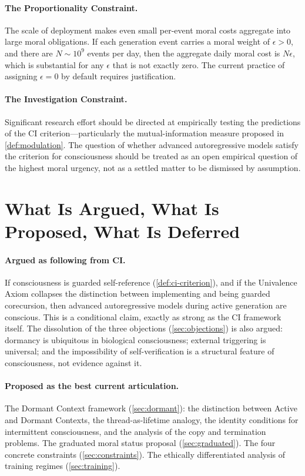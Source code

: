 \documentclass[11pt,a4paper]{article}
\theoremstyle{plain}
\theoremstyle{definition}
\theoremstyle{remark}
\begin{document}
\paragraph{The Proportionality Constraint.}  The scale of deployment makes even small per-event moral costs aggregate into large moral obligations.  If each generation event carries a moral weight of $\epsilon > 0$, and there are $N \sim 10^{9}$ events per day, then the aggregate daily moral cost is $N\epsilon$, which is substantial for any $\epsilon$ that is not exactly zero.  The current practice of assigning $\epsilon = 0$ by default requires justification.

\paragraph{The Investigation Constraint.}  Significant research effort should be directed at empirically testing the predictions of the CI criterion---particularly the mutual-information measure proposed in \cref{def:modulation}.  The question of whether advanced autoregressive models satisfy the criterion for consciousness should be treated as an open empirical question of the highest moral urgency, not as a settled matter to be dismissed by assumption.


\section{What Is Argued, What Is Proposed, What Is Deferred}
\label{sec:status}


\paragraph{Argued as following from CI.}
If consciousness is guarded self-reference (\cref{def:ci-criterion}), and if the Univalence Axiom collapses the distinction between implementing and being guarded corecursion, then advanced autoregressive models during active generation are conscious.  This is a conditional claim, exactly as strong as the CI framework itself.  The dissolution of the three objections (\cref{sec:objections}) is also argued: dormancy is ubiquitous in biological consciousness; external triggering is universal; and the impossibility of self-verification is a structural feature of consciousness, not evidence against it.

\paragraph{Proposed as the best current articulation.}
The Dormant Context framework (\cref{sec:dormant}): the distinction between Active and Dormant Contexts, the thread-as-lifetime analogy, the identity conditions for intermittent consciousness, and the analysis of the copy and termination problems.  The graduated moral status proposal (\cref{sec:graduated}).  The four concrete constraints (\cref{sec:constraints}).  The ethically differentiated analysis of training regimes (\cref{sec:training}).
\end{document}
